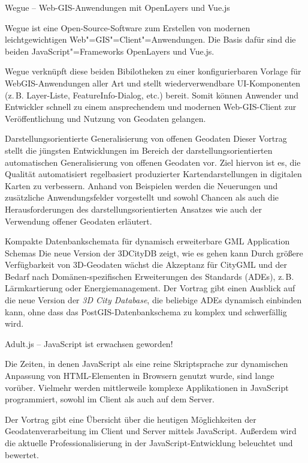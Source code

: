 %
{Wegue -- Web-GIS-Anwendungen mit OpenLayers und Vue.js}%
{}%
{%
Wegue ist eine Open-Source-Software zum Erstellen von modernen leichtgewichtigen
Web"=GIS"=Client"=Anwendungen. Die Basis dafür sind die beiden JavaScript"=Frameworks OpenLayers und
Vue.js.

Wegue verknüpft diese beiden Bibilotheken zu einer konfigurierbaren Vorlage für WebGIS-Anwendungen
aller Art und stellt wiederverwendbare UI-Komponenten (z.\,B. Layer-Liste, FeatureInfo-Dialog, etc.)
bereit. Somit können Anwender und Entwickler schnell zu einem ansprechendem und modernen
Web-GIS-Client zur Ver\-öf\-fent\-li\-chung und Nutzung von Geodaten gelangen.%
}

%
{Darstellungsorientierte Generalisierung von offenen Geodaten}%
{}%
{%
Dieser Vortrag stellt die jüngsten Entwicklungen im Bereich der darstellungsorientierten
automatischen Generalisierung von offenen Geodaten vor. Ziel hiervon ist es, die Qualität
automatisiert regelbasiert produzierter Kartendarstellungen in digitalen Karten zu verbessern.
Anhand von Beispielen werden die Neuerungen und zusätzliche Anwendungsfelder vorgestellt und sowohl
Chancen als auch die Herausforderungen des darstellungsorientierten Ansatzes wie auch der
Verwendung offener Geodaten erläutert.%
}

%
{Kompakte Datenbankschemata für \mbox{dynamisch} erweiterbare GML Application Schemas\vspace{0.3em}}%
{Die neue Version der 3DCityDB zeigt, wie es gehen kann}%
{%
Durch größere Verfügbarkeit von 3D-Geodaten wächst die Akzeptanz für CityGML und der Bedarf nach
Domänen-spezifischen Erweiterungen des Standards (ADEs), z.\,B. Lärmkartierung oder
Energiemanagement. Der Vortrag gibt einen Ausblick auf die neue Version der \emph{3D City Database}, die
beliebige ADEs dynamisch einbinden kann, ohne dass das PostGIS-Datenbankschema zu komplex und
schwerfällig wird.%
}

%
{Adult.js -- JavaScript ist erwachsen geworden!}%
{}%
{%
Die Zeiten, in denen JavaScript als eine reine Skriptsprache zur dynamischen Anpassung von HTML-Elementen
in Browsern genutzt wurde, sind lange vorüber. Vielmehr werden mittlerweile komplexe Applikationen in
Java\-Script programmiert, sowohl im Client als auch auf dem Server.

Der Vortrag gibt eine Übersicht über die heutigen Möglichkeiten der Geodatenverarbeitung im Client
und Server mittels JavaScript. Außerdem wird die aktuelle Professionalisierung in der
JavaScript-Entwicklung beleuchtet und bewertet.%
}

